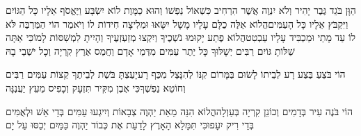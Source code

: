 \documentclass[../main/main.tex]{subfiles}
\begin{document}
\begin{multicols*}{\ncols}
הַוָּן\SubEnd{} בֹּגֵד גֶּבֶר יָהִיר וְלֹא יִנְוֶה אֲשֶׁר הִרְחִיב כִּשְׁאוֹל נַפְשׁוֹ וְהוּא כַמָּוֶת לוֹא\SubEnd{} יִשְׂבָּע וַיֶּאֱסֹף אֵלָיו כָּל הַגּוֹיִם וַיִּקְבֹּץ אֵלָיו כָּל הָעַמִּים\PreVerseSpace{}הֲלוֹא אֵלֶּה כֻלָּם עָלָיו מָשָׁל יִשָּׂאוּ וּמְלִיצָה חִידוֹת לוֹ וְיֹאמַר הוֹי הַמַּרְבֶּה לֹּא לוֹ עַד מָתַי וּמַכְבִּיד עָלָיו עַבְטִט\PreVerseSpace{}הֲלוֹא פֶתַע יָקוּמוּ נֹשְׁכֶיךָ וְיִקְצוּ מְזַעְזְעֶיךָ וְהָיִיתָ לִמְשִׁסּוֹת לָמוֹ\PreVerseSpace{}כִּי אַתָּה שַׁלּוֹתָ גּוֹיִם רַבִּים יְשָׁלּוּךָ כָּל יֶתֶר עַמִּים מִדְּמֵי אָדָם וַחֲמַס אֶרֶץ קִרְיָה וְכָל יֹשְׁבֵי בָהּ\OpenSection{}\par
{}הוֹי בֹּצֵעַ בֶּצַע רָע לְבֵיתוֹ לָשׂוּם בַּמָּרוֹם קִנּוֹ לְהִנָּצֵל מִכַּף רָע\PreVerseSpace{}יָעַצְתָּ בֹּשֶׁת לְבֵיתֶךָ קְצוֹת עַמִּים רַבִּים וְחוֹטֵא נַפְשֶׁךָ\PreVerseSpace{}כִּי אֶבֶן מִקִּיר תִּזְעָק וְכָפִיס מֵעֵץ יַעֲנֶנָּה\OpenSection{}\par
{}הוֹי בֹּנֶה עִיר בְּדָמִים וְכוֹנֵן קִרְיָה בְּעַוְלָה\PreVerseSpace{}הֲלוֹא הִנֵּה מֵאֵת יַהְוֶה צְבָאוֹת וְיִיגְעוּ עַמִּים בְּדֵי אֵשׁ וּלְאֻמִּים בְּדֵי רִיק יִעָפוּ\PreVerseSpace{}כִּי תִּמָּלֵא הָאָרֶץ לָדַעַת אֶת כְּבוֹד יַהְוֶה כַּמַּיִם יְכַסּוּ עַל יָם\OpenSection{}\par

\end{multicols*}
\end{document}
